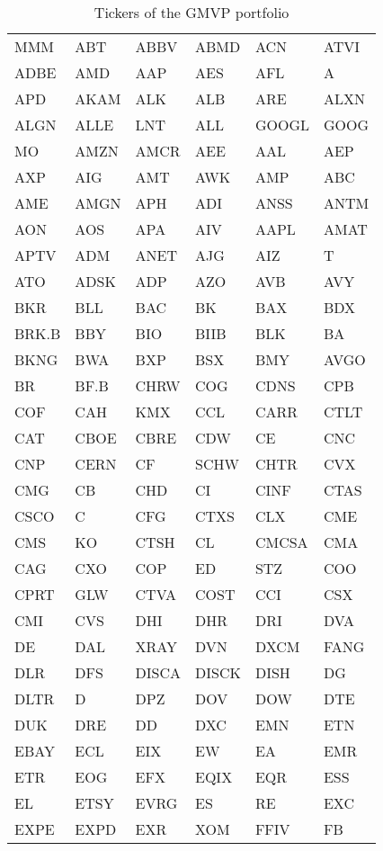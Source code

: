 \documentclass[a4paper]{report}
\begin{document}
\begin{table}[htbp]
\caption{Tickers of the GMVP portfolio}
\label{table:tickers}
\centering
\begin{tabular}{ |C{2cm}|C{2cm}|C{2cm}|C{2cm}|C{2cm}|C{2cm}| }
	\hline
	MMM & ABT & ABBV & ABMD & ACN & ATVI\\
	ADBE & AMD & AAP & AES & AFL & A\\
	APD & AKAM & ALK & ALB & ARE & ALXN\\
	ALGN & ALLE & LNT & ALL & GOOGL & GOOG\\
	MO & AMZN & AMCR & AEE & AAL & AEP\\
	AXP & AIG & AMT & AWK & AMP & ABC\\
	AME & AMGN & APH & ADI & ANSS & ANTM\\
	AON & AOS & APA & AIV & AAPL & AMAT\\
	APTV & ADM & ANET & AJG & AIZ & T\\
	ATO & ADSK & ADP & AZO & AVB & AVY\\
	BKR & BLL & BAC & BK & BAX & BDX\\
	BRK.B & BBY & BIO & BIIB & BLK & BA\\
	BKNG & BWA & BXP & BSX & BMY & AVGO\\
	BR & BF.B & CHRW & COG & CDNS & CPB\\
	COF & CAH & KMX & CCL & CARR & CTLT\\
	CAT & CBOE & CBRE & CDW & CE & CNC\\
	CNP & CERN & CF & SCHW & CHTR & CVX\\
	CMG & CB & CHD & CI & CINF & CTAS\\
	CSCO & C & CFG & CTXS & CLX & CME\\
	CMS & KO & CTSH & CL & CMCSA & CMA\\
	CAG & CXO & COP & ED & STZ & COO\\
	CPRT & GLW & CTVA & COST & CCI & CSX\\
	CMI & CVS & DHI & DHR & DRI & DVA\\
	DE & DAL & XRAY & DVN & DXCM & FANG\\
	DLR & DFS & DISCA & DISCK & DISH & DG\\
	DLTR & D & DPZ & DOV & DOW & DTE\\
	DUK & DRE & DD & DXC & EMN & ETN\\
	EBAY & ECL & EIX & EW & EA & EMR\\
	ETR & EOG & EFX & EQIX & EQR & ESS\\
	EL & ETSY & EVRG & ES & RE & EXC\\
	EXPE & EXPD & EXR & XOM & FFIV & FB\\

\end{tabular}
\end{table}
\end{document}
